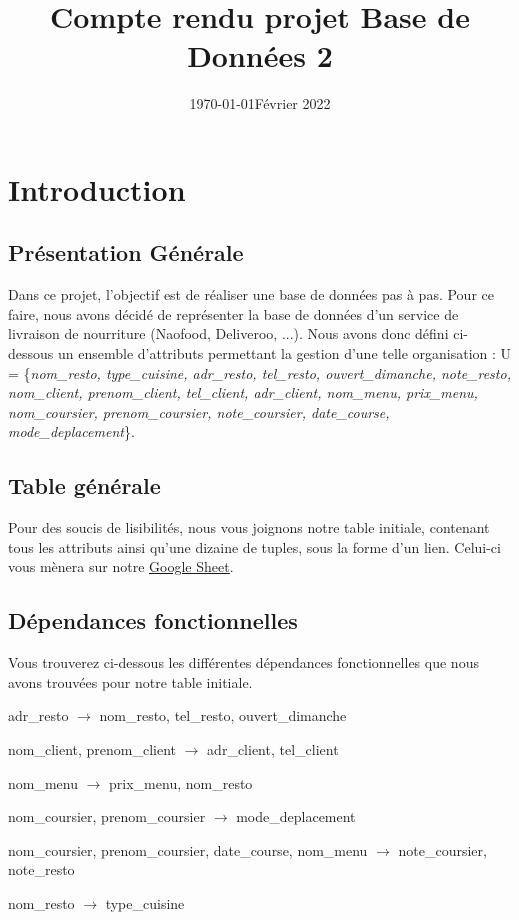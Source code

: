 \documentclass[french]{article}
\date{\today}
\title{Compte rendu projet Base de Données 2}
\author{\bsc{Billaud Maël} \and \bsc{Johan Quentin} \and \bsc{Ramé Tristan} \and \bsc{Goubon Valentin}}
\date{Février 2022}
\begin{document}

    \maketitle

    \section{Introduction}
        \subsection*{Présentation Générale}
            Dans ce projet, l'objectif est de réaliser une base de données pas à pas. Pour ce faire, nous avons décidé de représenter la base de données d'un service de livraison de nourriture (Naofood, Deliveroo, ...). Nous avons donc défini ci-dessous un ensemble d'attributs permettant la gestion d'une telle organisation :\newline 
            U = \{\emph{nom\_resto, type\_cuisine, adr\_resto, tel\_resto, ouvert\_dimanche, note\_resto, nom\_client, prenom\_client, tel\_client, adr\_client, nom\_menu, prix\_menu, nom\_coursier, prenom\_coursier, note\_coursier, date\_course, mode\_deplacement}\}.
            

        \subsection*{Table générale}
            Pour des soucis de lisibilités, nous vous joignons notre table initiale, contenant tous les attributs ainsi qu'une dizaine de tuples, sous la forme d'un lien. Celui-ci vous mènera sur notre 
            \href{https://docs.google.com/spreadsheets/d/1HeSNFvLN3-yMfWHoYLVumzOeQpHXJHynqVBusbvl6EQ/edit?usp=sharing}{\underline{Google Sheet}}.
        
        
        
        \subsection*{Dépendances fonctionnelles}
            Vous trouverez ci-dessous les différentes dépendances fonctionnelles que nous avons trouvées pour notre table initiale.
            \begin{df}
                \item adr\_resto $\rightarrow$ nom\_resto, tel\_resto, ouvert\_dimanche
                \item nom\_client, prenom\_client $\rightarrow$ adr\_client, tel\_client
                \item nom\_menu $\rightarrow$ prix\_menu, nom\_resto
                \item nom\_coursier, prenom\_coursier $\rightarrow$  mode\_deplacement
                \item nom\_coursier, prenom\_coursier, date\_course, nom\_menu $\rightarrow$ note\_coursier, note\_resto
                \item nom\_resto $\rightarrow$ type\_cuisine
            \end{df}
            
\end{document}
